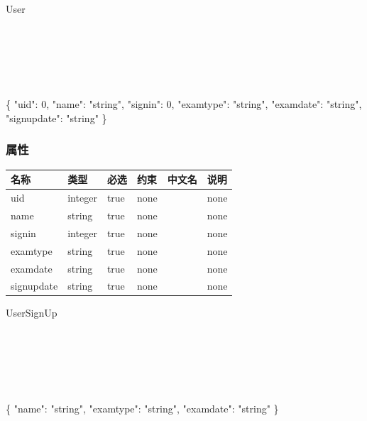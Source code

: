 \documentclass[
]{article}
\newenvironment{Shaded}{}{}
\newcommand{\DataTypeTok}[1]{\textcolor[rgb]{0.56,0.13,0.00}{#1}}
\newcommand{\DecValTok}[1]{\textcolor[rgb]{0.25,0.63,0.44}{#1}}
\newcommand{\FunctionTok}[1]{\textcolor[rgb]{0.02,0.16,0.49}{#1}}
\newcommand{\StringTok}[1]{\textcolor[rgb]{0.25,0.44,0.63}{#1}}
\begin{document}
User

\strut \\
\strut \\
\strut \\

\begin{Shaded}
\begin{Highlighting}[]
\FunctionTok{\{}
  \DataTypeTok{"uid"}\FunctionTok{:} \DecValTok{0}\FunctionTok{,}
  \DataTypeTok{"name"}\FunctionTok{:} \StringTok{"string"}\FunctionTok{,}
  \DataTypeTok{"signin"}\FunctionTok{:} \DecValTok{0}\FunctionTok{,}
  \DataTypeTok{"examtype"}\FunctionTok{:} \StringTok{"string"}\FunctionTok{,}
  \DataTypeTok{"examdate"}\FunctionTok{:} \StringTok{"string"}\FunctionTok{,}
  \DataTypeTok{"signupdate"}\FunctionTok{:} \StringTok{"string"}
\FunctionTok{\}}
\end{Highlighting}
\end{Shaded}

\hypertarget{ux5c5eux6027-10}{%
\subsubsection{属性}\label{ux5c5eux6027-10}}

\begin{longtable}[]{@{}llllll@{}}
\toprule
名称 & 类型 & 必选 & 约束 & 中文名 & 说明 \\
\midrule
\endhead
uid & integer & true & none & & none \\
name & string & true & none & & none \\
signin & integer & true & none & & none \\
examtype & string & true & none & & none \\
examdate & string & true & none & & none \\
signupdate & string & true & none & & none \\
\bottomrule
\end{longtable}

UserSignUp

\strut \\
\strut \\
\strut \\

\begin{Shaded}
\begin{Highlighting}[]
\FunctionTok{\{}
  \DataTypeTok{"name"}\FunctionTok{:} \StringTok{"string"}\FunctionTok{,}
  \DataTypeTok{"examtype"}\FunctionTok{:} \StringTok{"string"}\FunctionTok{,}
  \DataTypeTok{"examdate"}\FunctionTok{:} \StringTok{"string"}
\FunctionTok{\}}
\end{Highlighting}
\end{Shaded}
\end{document}

